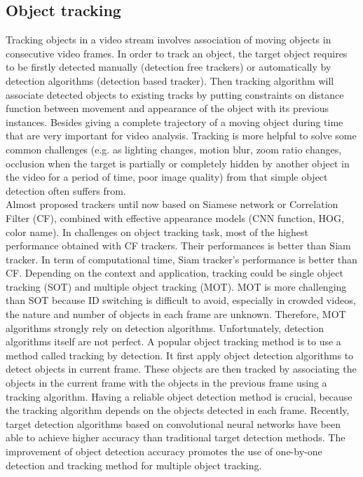 \subsection{Object tracking}
Tracking objects in a video stream involves association of moving objects in consecutive video frames. In order to track an object, the target object requires to be firstly detected manually (detection free trackers) or automatically by detection algorithms (detection based tracker). Then tracking algorithm will associate detected objects to existing tracks by putting constraints on distance function between movement and appearance of the object with its previous instances.  Besides giving a complete trajectory of a moving object during time that are very important for video analysis. Tracking is more helpful to solve some common challenges (e.g. as lighting changes, motion blur, zoom ratio changes, occlusion when the target is partially or completely hidden by another object in the video for a period of time, poor image quality) from that simple object detection often suffers from.
\\Almost proposed trackers until now based on Siamese network or Correlation Filter (CF), combined with effective appearance models (CNN function, HOG, color name). In challenges on object tracking task, most of the highest performance obtained with CF trackers. Their performances is better than Siam tracker. In term of computational time, Siam tracker's performance is better than CF. Depending on the context and application, tracking could be single object tracking (SOT) and multiple object tracking (MOT).
MOT is more challenging than SOT because ID switching is difficult to avoid, especially in crowded videos, the nature and number of objects in each frame are unknown. Therefore, MOT algorithms strongly rely on detection algorithms. Unfortunately, detection algorithms itself are not perfect. A popular object tracking method is to use a method called tracking by detection. It first apply object detection algorithms to detect objects in current frame. These objects are then tracked by associating the objects in the current frame with the objects in the previous frame using a tracking algorithm. Having a reliable object detection method is crucial, because the tracking algorithm depends on the objects detected in each frame. Recently, target detection algorithms based on convolutional neural networks have been able to achieve higher accuracy than traditional target detection methods. The improvement of object detection accuracy promotes the use of one-by-one detection and tracking method for multiple object tracking.
